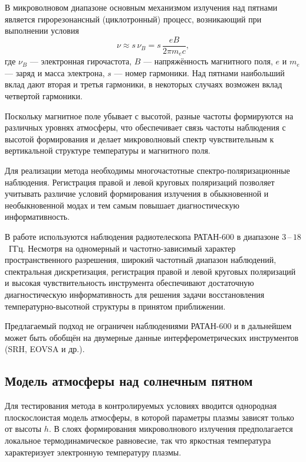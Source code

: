 \documentclass[
 aps, pra,
 amsmath,amssymb,
 11pt,
 final,
tightenlines,
 twoside,
 twocolumn,
 nofloats,
nofootinbib,
 superscriptaddress,
showkeys,
showkeywords,
 ]
{revtex4-2}
\newcommand{\as}[1]{{\color{blue} #1}}
\begin{document}
В микроволновом диапазоне основным механизмом излучения
над пятнами является гирорезонансный (циклотронный) процесс,
возникающий при выполнении условия
\begin{equation}
\nu \approx s\,\nu_B =
s\,\frac{eB}{2\pi m_e c},
\end{equation}
где $\nu_B$ --- электронная гирочастота, $B$ --- напряжённость
магнитного поля, $e$ и $m_e$ --- заряд и масса электрона,
$s$ --- номер гармоники.
\as{Над пятнами наибольший вклад дают
вторая и третья гармоники, в некоторых случаях возможен вклад четвертой гармоники}.

Поскольку магнитное поле убывает с высотой,
разные частоты формируются на различных уровнях атмосферы,
что обеспечивает связь частоты наблюдения с высотой формирования
и делает микроволновый спектр чувствительным
к вертикальной структуре температуры и магнитного поля.

Для реализации метода необходимы многочастотные
спектро-поляризационные наблюдения.
Регистрация правой и левой круговых поляризаций
позволяет учитывать различие условий формирования
излучения в обыкновенной и необыкновенной модах
и тем самым повышает диагностическую информативность.

В работе используются наблюдения радиотелескопа РАТАН-600 в диапазоне $3$\,--\,$18$~ГГц. Несмотря на одномерный и частотно-зависимый характер пространственного разрешения, широкий частотный диапазон наблюдений, спектральная дискретизация, регистрация правой и левой круговых поляризаций и высокая чувствительность инструмента обеспечивают достаточную диагностическую информативность для решения задачи восстановления температурно-высотной структуры в принятом приближении.

Предлагаемый подход не ограничен наблюдениями РАТАН-600
и  в дальнейшем может
быть обобщён на двумерные данные
интерферометрических инструментов
(SRH, EOVSA и др.).

\subsection{Модель атмосферы \as{над  солнечным пятном}}

Для тестирования метода в контролируемых условиях вводится однородная плоскослоистая модель атмосферы,
в которой параметры плазмы зависят только от высоты $h$. 
В слоях формирования микроволнового излучения
предполагается локальное термодинамическое равновесие,
так что яркостная температура характеризует
электронную температуру плазмы.
\end{document}
